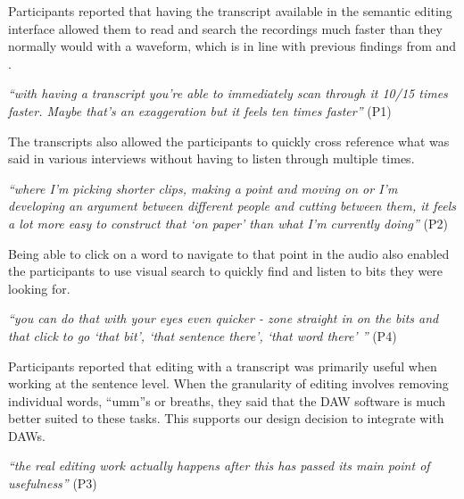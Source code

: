 Participants reported that having the transcript available in the semantic
editing interface allowed them to read and search the recordings much faster
than they normally would with a waveform, which is in line with previous findings from
\citet{Whittaker2004} and \citet{Yoon2014}.

\textit{``with having a transcript you're able to immediately scan through it
  10/15 times faster. Maybe that's an exaggeration but it feels ten times
  faster''} (P1)

The transcripts also allowed the participants to quickly cross reference what
was said in various interviews without having to listen through multiple times.

\textit{``where I'm picking shorter clips, making a point and moving on or I'm
  developing an argument between different people and cutting between them, it
  feels a lot more easy to construct that `on paper' than what I'm currently
  doing''} (P2)


Being able to click on a word to navigate to that point in the audio also
enabled the participants to use visual search to quickly find and listen to
bits they were looking for.

\textit{``you can do that with your eyes even quicker - zone straight in on the bits and that click to go  `that bit',
  `that sentence there', `that word there' ''} (P4)

Participants reported that editing with a transcript was primarily useful when working at the sentence level. When the
granularity of editing involves removing individual words, ``umm''s or breaths, they said that the DAW software is much
better suited to these tasks. This supports our design decision to integrate with DAWs.

\textit{``the real editing work actually happens after this has passed its main
  point of usefulness''} (P3)



